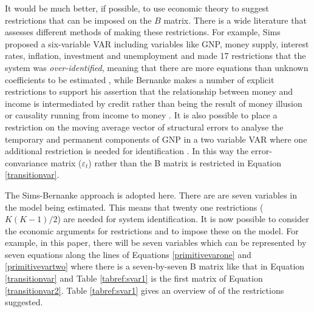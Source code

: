 \documentclass[12pt, a4paper, oneside]{article}\usepackage[]{graphicx}\usepackage[]{color}
\begin{document}
It would be much better, if possible, to use economic theory to suggest restrictions that can be imposed on the $B$ matrix.  There is a wide literature that assesses different methods of making these restrictions.  For example, Sims proposed a six-variable VAR including variables like GNP, money supply, interest rates, inflation, investment and unemployment and made 17 restrictions that the system was \emph{over-identified}, meaning that there are more equations than unknown coefficients to be estimated \citep{Sims1986}, while Bernanke makes a number of explicit restrictions to support his assertion that the relationship between money and income is intermediated by credit rather than being the result of money illusion or causality running from income to money \citep{Bernanke1986}.  It is also possible to  place a restriction on the moving average vector of structural errors to analyse the temporary and permanent components of GNP in a two variable VAR where one additional restriction is needed for identification \citep{BlanchardQuah}.  In this way the error-convariance matrix ($\varepsilon_t$) rather than the B matrix is restricted in Equation \ref{transitionvar}. 

The Sims-Bernanke approach is adopted here.  There are are seven variables in the model being estimated. This means that  twenty one restrictions ($K(K-1)/2$) are needed for system identification.    
It is now possible to consider the economic arguments for restrictions and to impose these on the model.  For example, in this paper, there will be seven variables which can be represented by seven equations along the lines of Equations \ref{primitivevarone} and \ref{primitivevartwo} where there is a seven-by-seven B matrix like that in Equation \ref{transitionvar} and Table \ref{tabref:svar1} is the first matrix of Equation \ref{transitionvar2}.  Table \ref{tabref:svar1} gives an overview of of the restrictions suggested.  
\end{document}
